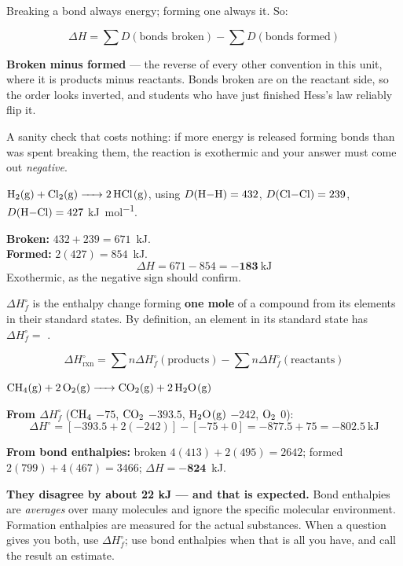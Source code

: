 \documentclass{apchem-notes}
\begin{document}


Breaking a bond always  energy; forming one
always  it. So:

\[ \boxed{\;\Delta H = \sum D(\text{bonds broken})
   - \sum D(\text{bonds formed})\;} \]

\begin{apctrap}
\textbf{Broken minus formed} --- the reverse of every other convention in
this unit, where it is products minus reactants. Bonds broken are on the
reactant side, so the order looks inverted, and students who have just
finished Hess's law reliably flip it.

A sanity check that costs nothing: if more energy is released forming bonds
than was spent breaking them, the reaction is exothermic and your answer
must come out \emph{negative}.
\end{apctrap}

\begin{workedexample}
$\ce{H2(g) + Cl2(g) -> 2HCl(g)}$, using
$D(\ce{H-H}) = 432$, $D(\ce{Cl-Cl}) = 239$, $D(\ce{H-Cl}) = 427$
\si{\kilo\joule\per\mole}.

\textbf{Broken:} $432 + 239 = 671$~kJ. \\
\textbf{Formed:} $2(427) = 854$~kJ.
\[ \Delta H = 671 - 854 = \mathbf{-183}~\text{kJ} \]
Exothermic, as the negative sign should confirm.
\end{workedexample}


$\Delta H_f^\circ$ is the enthalpy change forming \textbf{one mole} of a
compound from its elements in their standard states. By definition, an
element in its standard state has $\Delta H_f^\circ =$
.

\[ \Delta H^\circ_{\text{rxn}} = \sum n\Delta H_f^\circ(\text{products})
   - \sum n\Delta H_f^\circ(\text{reactants}) \]

\begin{workedexample}
$\ce{CH4(g) + 2O2(g) -> CO2(g) + 2H2O(g)}$

\textbf{From $\Delta H_f^\circ$} ($\ce{CH4}$ $-75$, $\ce{CO2}$ $-393.5$,
$\ce{H2O(g)}$ $-242$, $\ce{O2}$ $0$):
\[ \Delta H^\circ = [-393.5 + 2(-242)] - [-75 + 0] =
   -877.5 + 75 = \mathbf{-802.5}~\text{kJ} \]

\textbf{From bond enthalpies:} broken $4(413) + 2(495) = 2642$;
formed $2(799) + 4(467) = 3466$; $\Delta H = \mathbf{-824}$~kJ.

\textbf{They disagree by about 22 kJ --- and that is expected.} Bond
enthalpies are \emph{averages} over many molecules and ignore the specific
molecular environment. Formation enthalpies are measured for the actual
substances. When a question gives you both, use $\Delta H_f^\circ$; use
bond enthalpies when that is all you have, and call the result an estimate.
\end{workedexample}
\end{document}
